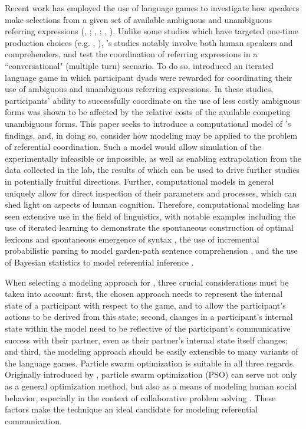\documentclass[11pt]{article}
\begin{document}
Recent work has employed the use of language games to investigate how speakers make selections from a given set of available ambiguous and unambiguous referring expressions (\citeauthor{rohde2012}, \citeyear{rohde2012}; \citeauthor{degen2012}, \citeyear{degen2012}; \citeauthor{frank2012}, \citeyear{frank2012}). Unlike some studies which have targeted one-time production choices (e.g. \citeauthor{degen2012}, \citeyear{degen2012}), \citeauthor{rohde2012}'s studies notably involve both human speakers and comprehenders, and test the coordination of referring expressions in a ``conversational" (multiple turn) scenario. To do so, \citeauthor{rohde2012} introduced an iterated language game in which participant dyads were rewarded for coordinating their use of ambiguous and unambiguous referring expressions. In these studies, participants' ability to successfully coordinate on the use of less costly ambiguous forms was shown to be affected by the relative costs of the available competing unambiguous forms. This paper seeks to introduce a computational model of \citeauthor{rohde2012}'s findings, and, in doing so, consider how modeling may be applied to the problem of referential coordination. Such a model would allow simulation of the experimentally infeasible or impossible, as well as enabling extrapolation from the data collected in the lab, the results of which can be used to drive further studies in potentially fruitful directions. Further, computational models in general uniquely allow for direct inspection of their parameters and processes, which can shed light on aspects of human cognition. Therefore, computational modeling has seen extensive use in the field of linguistics, with notable examples including the use of iterated learning to demonstrate the spontaneous construction of optimal lexicons \citep{smith2002} and spontaneous emergence of syntax \citep{kirby2002}, the use of incremental probabilistic parsing to model garden-path sentence comprehension \citep{hale2001}, and the use of Bayesian statistics to model referential inference \citep{frank2012}.

When selecting a modeling approach for \cite{rohde2012}, three crucial considerations must be taken into account: first, the chosen approach needs to represent the internal state of a participant with respect to the game, and to allow the participant's actions to be derived from this state; second, changes in a participant's internal state within the model need to be reflective of the participant's communicative success with their partner, even as their partner's internal state itself changes; and third, the modeling approach should be easily extensible to many variants of the \citeauthor{rohde2012} language games. Particle swarm optimization is suitable in all three regards. Originally introduced by \citet*{kennedy1995}, particle swarm optimization (PSO) can serve not only as a general optimization method, but also as a means of modeling human social behavior, especially in the context of collaborative problem solving \citep{kennedy1997}. These factors make the technique an ideal candidate for modeling referential communication. 
\end{document}
